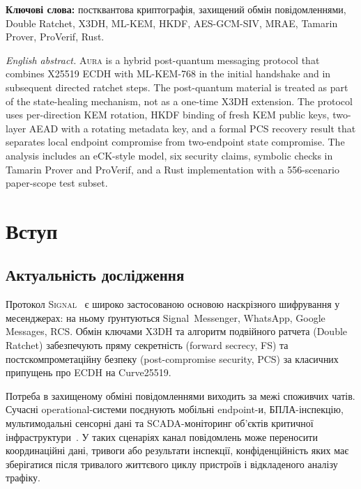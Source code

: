 \documentclass[11pt,a4paper]{article}
\theoremstyle{definition}
\newcommand{\eCK}{\textsf{eCK}}
\newcommand{\Aura}{\mbox{\normalfont\scshape Aura}}
\newcommand{\Signal}{\mbox{\normalfont\scshape Signal}}
\begin{document}
\smallskip
\noindent\textbf{Ключові слова:} постквантова криптографія, захищений
обмін повідомленнями, Double Ratchet, X3DH, ML-KEM, HKDF,
AES-GCM-SIV, MRAE, Tamarin Prover, ProVerif, Rust.

\medskip
\noindent\textit{English abstract.}
\Aura{} is a hybrid post-quantum messaging protocol that combines X25519
ECDH with ML-KEM-768 in the initial handshake and in subsequent
directed ratchet steps. The post-quantum material is treated as part
of the state-healing mechanism, not as a one-time X3DH extension. The
protocol uses per-direction KEM rotation, HKDF binding of fresh KEM public
keys, two-layer AEAD with a rotating metadata key, and a formal
PCS recovery result that separates local endpoint compromise from
two-endpoint state compromise. The analysis
includes an \eCK{}-style model, six security claims, symbolic checks in
Tamarin Prover and ProVerif, and a Rust implementation with a 556-scenario
paper-scope test subset.

\tableofcontents
\newpage


\section{Вступ}\label{sec:intro}

\subsection{Актуальність дослідження}\label{sec:relevance}

Протокол \Signal{}~\cite{signal-x3dh,cohn-gordon2020} є широко застосованою
основою наскрізного шифрування у месенджерах: на ньому ґрунтуються
Signal~Messenger, WhatsApp, Google Messages, RCS. Обмін ключами X3DH та
алгоритм подвійного ратчета (Double Ratchet) забезпечують пряму секретність
(forward secrecy, FS) та постскомпрометаційну безпеку (post-compromise
security, PCS) за класичних припущень про ECDH на Curve25519.

Потреба в захищеному обміні повідомленнями виходить за межі споживчих
чатів. Сучасні operational-системи поєднують мобільні endpoint-и,
БПЛА-інспекцію, мультимодальні сенсорні дані та SCADA-моніторинг
об'єктів критичної інфраструктури~\cite{svystun2025dytam,svystun2024thermal,lysyi2025fire}.
У таких сценаріях канал повідомлень може переносити координаційні дані,
тривоги або результати інспекції, конфіденційність яких має зберігатися
після тривалого життєвого циклу пристроїв і відкладеного аналізу трафіку.
\end{document}
